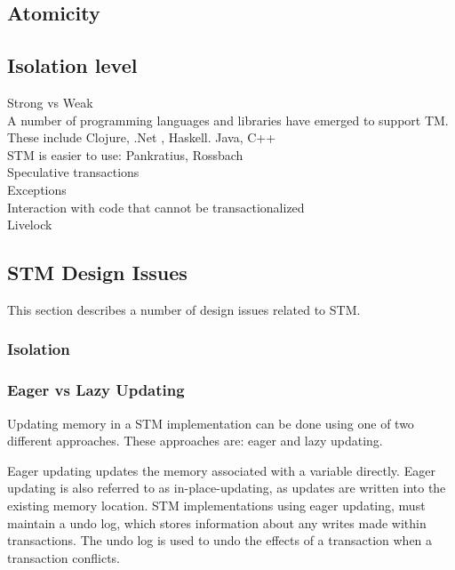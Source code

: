 \subsection{Atomicity}

\subsection{Isolation level}
Strong vs Weak\\





A number of programming languages and libraries have emerged to support TM. These include Clojure, .Net , Haskell. Java, C++\\
STM is easier to use: Pankratius, Rossbach\\
Speculative transactions\\

Exceptions\\
Interaction with code that cannot be transactionalized\\
Livelock\\

\subsection{\ac{STM} Design Issues}
This section describes a number of design issues related to \ac{STM}.
\subsubsection{Isolation}
\subsubsection{Eager vs Lazy Updating}
Updating memory in a \ac{STM} implementation can be done using one of two different approaches. These approaches are: eager and lazy updating.

Eager updating updates the memory associated with a variable directly. Eager updating is also referred to as in-place-updating, as updates are written into the existing memory location\cite[p. 35]{afek2011lowering}. \ac{STM} implementations using eager updating, must maintain a undo log, which stores information about any writes made within transactions. The undo log is used to undo the effects of a transaction when a transaction conflicts\cite[p. 2084]{herlihy2011tm}.

